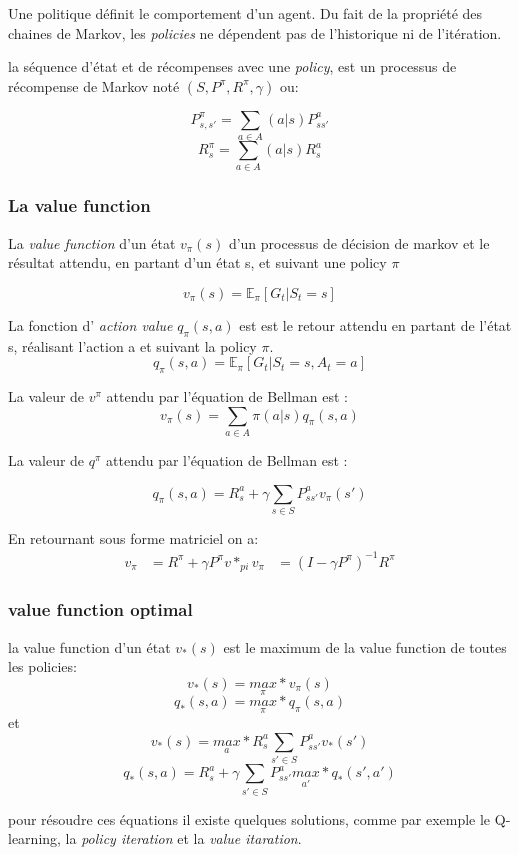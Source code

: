 \documentclass[a4paper,10pt]{article}
\begin{document}
Une politique définit le comportement d'un agent. Du fait de la propriété des chaines de Markov, les \textit{policies} ne dépendent pas de l'historique ni de l'itération.
\par
la séquence d'état et de récompenses avec une \textit{policy}, est un processus de récompense de Markov noté $(S,P^{\pi},R^{\pi},\gamma)$ ou:
\par
\[
P^{\pi }_{s,s'}= \sum_{a \in A} (a|s)P^{a}_{ss'}
\]
\[
R^{\pi}_{s}=\sum_{a \in A} (a|s)R^{a}_{s}
\]


\subsubsection{La value function}
La\textit{ value function} d'un état $v_{\pi}(s)$ d'un processus de décision de markov et le résultat attendu, en partant d'un état s, et suivant une policy $\pi$

\[
v_{\pi}(s) = \mathbb{E}_{\pi}[G_t|S_t = s]
\]

La fonction d' \textit{action value} $q_{\pi}(s,a)$ est est le retour attendu en partant de l'état s, réalisant l'action a et suivant la policy $\pi$.
\[
q_{\pi}(s,a) = \mathbb{E}_{\pi}[G_t|S_t =s,A_t =a]
\]

La valeur de $v^{\pi}$ attendu par l'équation de Bellman est :
\[
v_{\pi}(s)= \sum_{a \in A} \pi (a|s)q_{\pi}(s,a)
\]

La valeur de $q^{\pi}$ attendu par l'équation de Bellman est :

\[
q_{\pi}(s,a)= R^{a}_s + \gamma \sum_{s \in S} P^{a}_{ss'}v_{\pi}(s')
\]

En retournant sous forme matriciel on a:
\[
\begin{aligned}
v_{\pi} &= R^{\pi} + \gamma P^{\pi} v*_{pi}
v_{\pi} &= (I - \gamma P^{\pi})^{-1} R^{\pi}
\end{aligned}
\]
\subsubsection{value function optimal}

la value function d'un état $v_*(s)$ est le maximum de la value function de toutes les policies:
\[
 v_*(s) = \underset{\pi}{max}* v_{\pi}(s) 
\]
\[
 q_*(s,a) =\underset{\pi}{max}*q_{\pi}(s,a) 
\]
et
\[
  v_*(s) = \underset{a}{max}*R^{a}_s \sum_{s' \in S} P^{a}_{ss'} v_* (s') 
\]
\[
q_*(s,a) = R^{a}_s + \gamma \sum_{s' \in S} P^{a}_{ss'} \underset{a'}{max}* q_*(s',a') 
\]

pour résoudre ces équations il existe quelques solutions, comme par exemple le Q-learning, la \textit{policy iteration} et la \textit{value itaration}.
\end{document}
